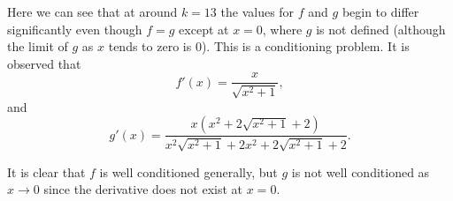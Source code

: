\documentclass[12pt,a4paper]{article}
\begin{document}

Here we can see that at around $k = 13$ the values for $f$ and $g$ begin to differ significantly even though $f = g$ except at $x = 0$, where $g$ is not defined (although the limit of $g$ as $x$ tends to zero is 0).
This is a conditioning problem. 
It is observed that 
\[
f'\left( x \right) = \frac{x}{\sqrt{x^{2} + 1}}
,\]
and
\[
g'\left( x \right) = \frac{x \left(x^{2} + 2 \sqrt{x^{2} + 1} + 2\right)}{x^{2} \sqrt{x^{2} + 1} + 2 x^{2} + 2 \sqrt{x^{2} + 1} + 2}
.\]

It is clear that $f$ is well conditioned generally, but $g$ is not well conditioned as $x \rightarrow 0$ since the derivative does not exist at $x=0$.
\end{document}
